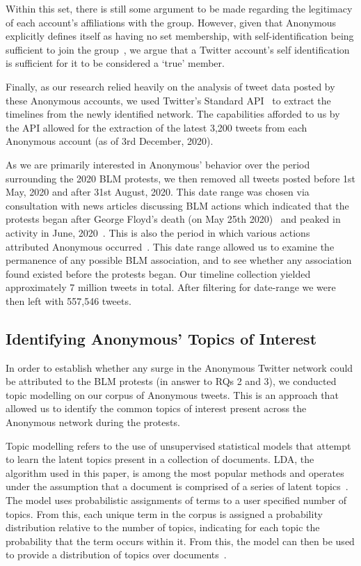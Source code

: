 \documentclass[letterpaper]{article}
\begin{document}
Within this set, there is still some argument to be made regarding the legitimacy of each account's affiliations with the group. However, given that Anonymous explicitly defines itself as having no set membership, with self-identification being sufficient to join the group~\cite{Olson2013}, we argue that a Twitter account's self identification is sufficient for it to be considered a `true' member.

Finally, as our research relied heavily on the analysis of tweet data posted by these Anonymous accounts, we used Twitter's Standard API~\cite{TwitterAPI} to extract the timelines from the newly identified network. The capabilities afforded to us by the API allowed for the extraction of the latest 3,200 tweets from each Anonymous account (as of 3rd December, 2020). 

As we are primarily interested in Anonymous' behavior over the period surrounding the 2020 BLM protests, we then removed all tweets posted before 1st May, 2020 and after 31st August, 2020. This date range was chosen via consultation with news articles discussing BLM actions which indicated that the protests began after George Floyd's death (on May 25th 2020)~\cite{AlJazeera2020, Independant2020} and peaked in activity in June, 2020~\cite{NYT2020}. This is also the period in which various actions attributed Anonymous occurred~\cite{AJC2020}. This date range allowed us to examine the permanence of any possible BLM association, and to see whether any association found existed before the protests began. Our timeline collection yielded approximately 7 million tweets in total. After filtering for date-range we were then left with 557,546 tweets.

\subsection{Identifying Anonymous' Topics of Interest}

In order to establish whether any surge in the Anonymous Twitter network could be attributed to the BLM protests (in answer to RQs 2 and 3), we conducted topic modelling on our corpus of Anonymous tweets. This is an approach that allowed us to identify the common topics of interest present across the Anonymous network during the protests.

Topic modelling refers to the use of unsupervised statistical models that attempt to learn the latent topics present in a collection of documents. LDA, the algorithm used in this paper, is among the most popular methods and operates under the assumption that a document is comprised of a series of latent topics~\cite{Kigerl2018}. The model uses probabilistic assignments of terms to a user specified number of topics. From this, each unique term in the corpus is assigned a probability distribution relative to the number of topics, indicating for each topic the probability that the term occurs within it. From this, the model can then be used to provide a distribution of topics over documents~\cite{Kigerl2018}.
\end{document}
